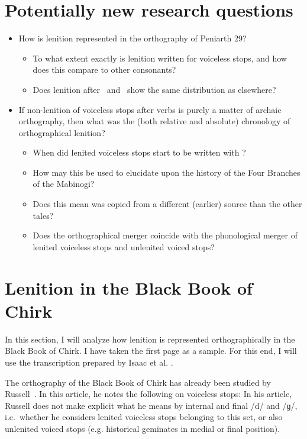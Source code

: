  \section{Potentially new research questions}
 \begin{itemize}
 \item How is lenition represented in the orthography of Peniarth 29?
 \begin{itemize}
 \item To what extent exactly is lenition written for voiceless stops, and how does this compare to other consonants?
 \item Does lenition after \ei\ and \oes\ show the same distribution as elsewhere?
 \end{itemize}
 \item If non-lenition of voiceless stops after verbs is purely a matter of archaic orthography, then what was the (both relative and absolute) chronology of orthographical lenition?
 \begin{itemize}
 \item When did lenited voiceless stops start to be written with ?
 \item How may this be used to elucidate upon the history of the Four Branches of the Mabinogi? \item Does this mean  was copied from a different (earlier) source than the other tales? 
 \item Does the orthographical merger coincide with the phonological merger of lenited voiceless stops and unlenited voiced stops?
 \end{itemize}
 \end{itemize}
 
 \section{Lenition in the Black Book of Chirk}
 
 In this section, I will analyze how lenition is represented orthographically in the Black Book of Chirk. I have taken the first page as a sample. For this end, I will use the transcription prepared by Isaac et al. \parencite*{isaac_rhyddiaith_2013}.
 
 The orthography of the Black Book of Chirk has already been studied by Russell~\parencite*{russell_scribal_1995}. In this article, he notes the following on voiceless stops:  In his article, Russell does not make explicit what he means by internal and final /d/ and /ɡ/, i.e.\ whether he considers lenited voiceless stops belonging to this set, or also unlenited voiced stops (e.g. historical geminates in medial or final position).

